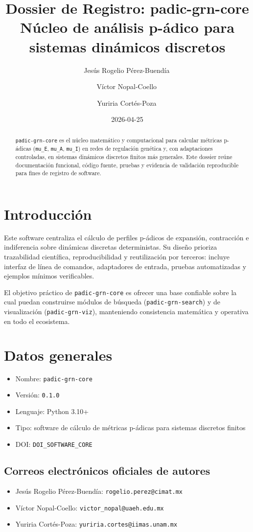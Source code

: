 \documentclass[11pt]{article}
\title{Dossier de Registro: padic-grn-core\\\large Núcleo de análisis p-ádico para sistemas dinámicos discretos}
\author{
Jesús Rogelio Pérez-Buendía\,\orcidlink{0000-0002-7739-4779}
\and
Víctor Nopal-Coello\,\orcidlink{0000-0003-2608-3636}
\and
Yuriria Cortés-Poza\,\orcidlink{0000-0003-1856-9206}
}
\date{2026-04-25}
\begin{document}
\maketitle
\begin{abstract}
\texttt{padic-grn-core} es el núcleo matemático y computacional para calcular métricas p-ádicas (\texttt{mu\_E}, \texttt{mu\_A}, \texttt{mu\_I}) en redes de regulación genética y, con adaptaciones controladas, en sistemas dinámicos discretos finitos más generales. Este dossier reúne documentación funcional, código fuente, pruebas y evidencia de validación reproducible para fines de registro de software.
\end{abstract}
\tableofcontents
\newpage

\section{Introducción}
Este software centraliza el cálculo de perfiles p-ádicos de expansión, contracción e indiferencia sobre dinámicas discretas deterministas. Su diseño prioriza trazabilidad científica, reproducibilidad y reutilización por terceros: incluye interfaz de línea de comandos, adaptadores de entrada, pruebas automatizadas y ejemplos mínimos verificables.

El objetivo práctico de \texttt{padic-grn-core} es ofrecer una base confiable sobre la cual puedan construirse módulos de búsqueda (\texttt{padic-grn-search}) y de visualización (\texttt{padic-grn-viz}), manteniendo consistencia matemática y operativa en todo el ecosistema.

\section{Datos generales}
\begin{itemize}
  \item Nombre: \texttt{padic-grn-core}
  \item Versión: \texttt{0.1.0}
  \item Lenguaje: Python 3.10+
  \item Tipo: software de cálculo de métricas p-ádicas para sistemas discretos finitos
  \item DOI: \texttt{DOI\_SOFTWARE\_CORE}
\end{itemize}

\subsection{Correos electrónicos oficiales de autores}
\begin{itemize}
  \item Jesús Rogelio Pérez-Buendía: \texttt{rogelio.perez@cimat.mx}
  \item Víctor Nopal-Coello: \texttt{victor\_nopal@uaeh.edu.mx}
  \item Yuriria Cortés-Poza: \texttt{yuriria.cortes@iimas.unam.mx}
\end{itemize}
\end{document}
